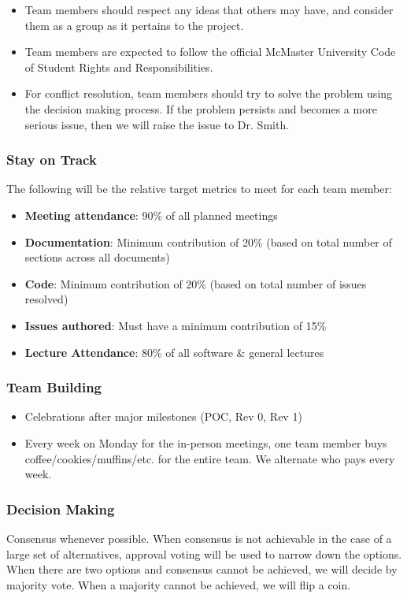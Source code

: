 \documentclass{article}
\begin{document}
\begin{itemize}
    \item Team members should respect any ideas that others may have, and consider them as a group as it pertains to the project.
    \item Team members are expected to follow the official McMaster University Code of Student Rights and Responsibilities.
    \item For conflict resolution, team members should try to solve the problem using the decision making process. If the problem persists and becomes a more serious issue, then we will raise the issue to Dr. Smith.
\end{itemize}

\subsubsection*{Stay on Track}

The following will be the relative target metrics to meet for each team member:
\begin{itemize}
    \item \textbf{Meeting attendance}: 90\% of all planned meetings
    \item \textbf{Documentation}: Minimum contribution of 20\% (based on total number of sections across all documents)
    \item \textbf{Code}: Minimum contribution of 20\% (based on total number of issues resolved)
    \item \textbf{Issues authored}: Must have a minimum contribution of 15\%
    \item \textbf{Lecture Attendance}: 80\% of all software \& general lectures
\end{itemize}

\subsubsection*{Team Building}

\begin{itemize}
    \item Celebrations after major milestones (POC, Rev 0, Rev 1)
    \item Every week on Monday for the in-person meetings, one team member buys coffee/cookies/muffins/etc. for the entire team. We alternate who pays every week.
\end{itemize}

\subsubsection*{Decision Making} 

Consensus whenever possible. When consensus is not achievable in the case of a large set of alternatives, approval voting will be used to narrow down the options. When there are two options and consensus cannot be achieved, we will decide by majority vote. When a majority cannot be achieved, we will flip a coin.
\end{document}
